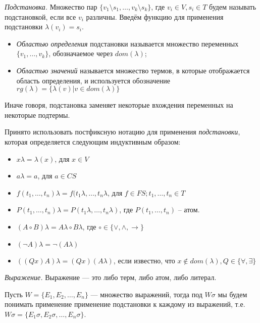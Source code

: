 \begin{definition}
  \emph{Подстановка.} Множество пар $\{v_1 \setminus s_1, \ldots, v_k \setminus s_k\}$, где $v_i \in V, s_i \in T$ будем называть подстановкой, если все $v_i$ различны. Введём функцию для применения подстановки $\lambda(v_i) = s_i$.
\begin{itemize}  
  \item \emph{Областью определения} подстановки называется множество переменных $\{v_1, \ldots, v_k\}$, обозначаемое через $dom(\lambda)$; 
  \item \emph{Областью значений} называется множество термов, в которые отображается область определения, и используется обозначение $rg(\lambda) = \{\lambda(v) | v \in dom(\lambda)\}$
\end{itemize}
\end{definition}

Иначе говоря, подстановка заменяет некоторые вхождения переменных на некоторые подтермы.

Принято использовать постфиксную нотацию для применения \emph{подстановки}, которая определяется следующим индуктивным образом: 
\begin{itemize}
	\item $x\lambda = \lambda(x)$, для $x \in V$
    \item $a\lambda = a$, для $a \in CS$
    \item $f(t_1, \ldots, t_n)\lambda = f(t_1\lambda, \ldots, t_n\lambda$, для $f \in FS; t_1,\ldots,t_n \in T$
    \item $P(t_1, \ldots, t_n)\lambda = P(t_1\lambda, \ldots, t_n\lambda)$, где $P(t_1, \ldots, t_n)$ -- атом.
    \item $(A \circ B)\lambda = A\lambda \circ B\lambda$, где $\circ \in \{\vee, \wedge, \rightarrow\}$
    \item $(\neg A)\lambda = \neg(A\lambda)$
    \item $((Qx)A)\lambda = (Qx)(A\lambda)$, если известно, что $x \notin dom(\lambda), Q \in \{\forall, \exists\}$
\end{itemize}

\begin{definition}
  \emph{Выражение.} Выражение --- это либо терм, либо атом, либо литерал.
\end{definition}

Пусть $W = \{E_1, E_2, \ldots, E_n\}$ --- множество выражений, тогда под $W\sigma$ мы будем понимать применение применение подстановки к каждому из выражений, т.е. $W\sigma = \{E_1\sigma, E_2\sigma, \ldots, E_n\sigma\}$.

